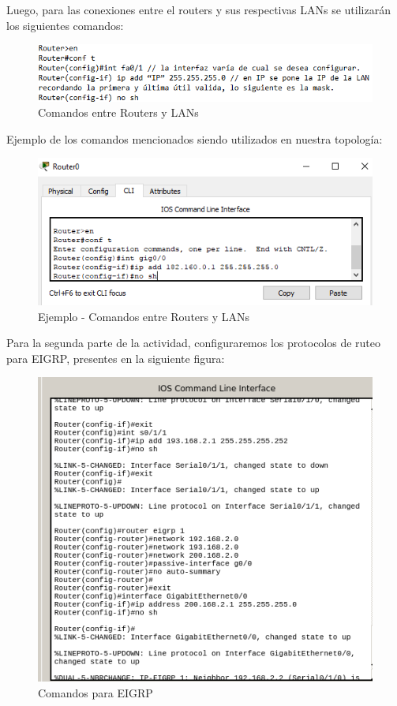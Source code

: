 \documentclass{article}
\begin{document}
Luego, para las conexiones entre el routers y sus respectivas LANs se utilizarán los siguientes comandos:

\begin{figure}[h!]
\centering
\includegraphics[scale=0.65]{RouLan.png}
\caption{Comandos entre Routers y LANs}
\label{fig:com2}
\end{figure}

Ejemplo de los comandos mencionados siendo utilizados en nuestra topología:

\begin{figure}[h!]
\centering
\includegraphics[scale=0.65]{Ej2.png}
\caption{Ejemplo - Comandos entre Routers y LANs}
\label{fig:ejem2}
\end{figure}

\newpage

Para la segunda parte de la actividad, configuraremos los protocolos de ruteo para EIGRP, presentes en la siguiente figura:

\begin{figure}[h!]
\centering
\includegraphics[scale=0.65]{Actpart2.png}
\caption{Comandos para EIGRP}
\label{fig:com3}
\end{figure}
\end{document}
